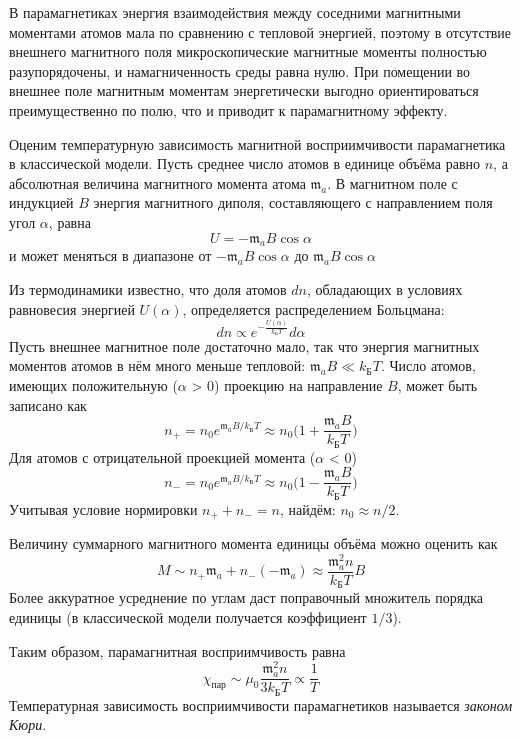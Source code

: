 \documentclass[a4paper,12pt]{article}
\begin{document}
В парамагнетиках энергия взаимодействия между соседними магнитными моментами атомов мала по сравнению с тепловой энергией, поэтому в отсутствие внешнего магнитного поля микроскопические магнитные моменты полностью разупорядочены, и намагниченность среды равна нулю. При помещении во внешнее поле магнитным моментам энергетически выгодно ориентироваться преимущественно по полю, что и приводит к парамагнитному эффекту.

Оценим температурную зависимость магнитной восприимчивости парамагнетика в классической модели.  Пусть среднее число атомов в единице объёма равно $n$, а абсолютная величина магнитного момента атома $\mathfrak{m}_a$. В магнитном поле с индукцией $B$ энергия магнитного диполя, составляющего с направлением поля угол $\alpha$, равна
\[U = -\mathfrak{m}_a B \cos \alpha\]
и может меняться в диапазоне от $ -\mathfrak{m}_a B \cos \alpha$ до $\mathfrak{m}_a B \cos \alpha $

Из термодинамики известно, что доля атомов $dn$, обладающих в условиях равновесия энергией $U(\alpha)$, определяется распределением Больцмана:
\[dn \propto e^{- \frac{U(\alpha)}{k_{Б} T}}d\alpha\]
Пусть внешнее магнитное поле достаточно мало, так что энергия магнитных моментов атомов в нём много меньше тепловой: $\mathfrak{m}_a B \ll k_{Б} T$. Число
атомов, имеющих положительную ($\alpha$ > 0) проекцию на направление $B$, может быть записано как
\[n_{+} = n_0 e^{\mathfrak{m}_a B / k_{Б} T} \approx n_0 \Big(1 + \frac{\mathfrak{m}_a B}{k_{Б} T}\Big)\]
 Для атомов с отрицательной проекцией момента ($\alpha$ < 0)
 \[n_{-} = n_0 e^{\mathfrak{m}_a B / k_{Б} T} \approx n_0 \Big(1 - \frac{\mathfrak{m}_a B}{k_{Б} T}\Big)\]
Учитывая условие нормировки $n_{+} + n_{-} = n$, найдём: $n_0 \approx n / 2$.

Величину суммарного магнитного момента единицы объёма можно оценить как
\[M \sim n_{+} \mathfrak{m}_a + n_{-} (-\mathfrak{m}_a) \approx \frac{\mathfrak{m}_a^2 n }{k_{Б} T} B\]
Более аккуратное усреднение по углам даст поправочный множитель порядка единицы (в классической модели получается коэффициент $1 / 3$).

Таким образом, парамагнитная восприимчивость равна
\[\chi_{пар} \sim \mu_0 \frac{\mathfrak{m}_a^2 n }{3 k_{Б} T} \propto \frac{1}{T}\]
Температурная зависимость восприимчивости парамагнетиков называется \textit{законом Кюри}.
\end{document}
